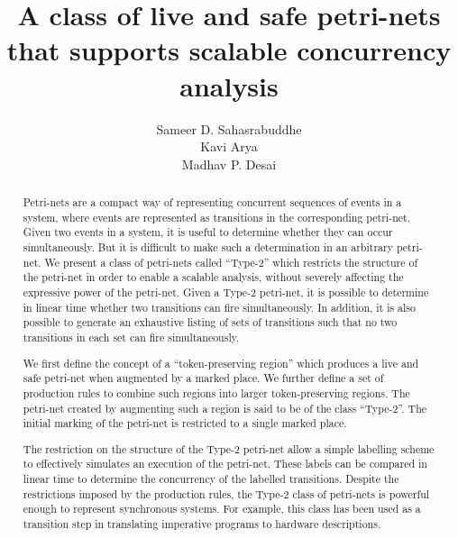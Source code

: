 \documentclass[12pt,a4paper]{article}
\title{A class of live and safe petri-nets that supports scalable
  concurrency analysis}
\author{Sameer D. Sahasrabuddhe \\ Kavi Arya \\ Madhav P. Desai}
\date{}
\begin{document}
\maketitle

\begin{abstract}
  \large

  Petri-nets are a compact way of representing concurrent sequences of
  events in a system, where events are represented as transitions in
  the corresponding petri-net. Given two events in a system, it is
  useful to determine whether they can occur simultaneously. But it is
  difficult to make such a determination in an arbitrary petri-net. We
  present a class of petri-nets called ``Type-2'' which restricts the
  structure of the petri-net in order to enable a scalable analysis,
  without severely affecting the expressive power of the petri-net.
  Given a Type-2 petri-net, it is possible to determine in linear time
  whether two transitions can fire simultaneously. In addition, it is
  also possible to generate an exhaustive listing of sets of
  transitions such that no two transitions in each set can fire
  simultaneously.
  
  We first define the concept of a ``token-preserving region'' which
  produces a live and safe petri-net when augmented by a marked place.
  We further define a set of production rules to combine such regions
  into larger token-preserving regions. The petri-net created by
  augmenting such a region is said to be of the class ``Type-2''. The
  initial marking of the petri-net is restricted to a single marked
  place.

  The restriction on the structure of the Type-2 petri-net allow a
  simple labelling scheme to effectively simulates an execution of the
  petri-net. These labels can be compared in linear time to determine
  the concurrency of the labelled transitions. Despite the
  restrictions imposed by the production rules, the Type-2 class of
  petri-nets is powerful enough to represent synchronous systems. For
  example, this class has been used as a transition step in
  translating imperative programs to hardware descriptions.

\end{abstract}
\end{document}

